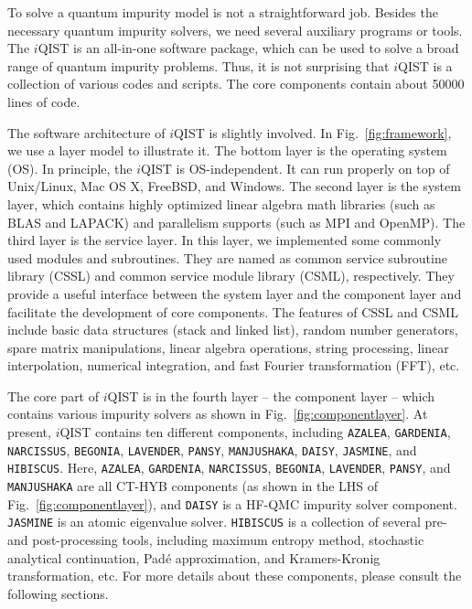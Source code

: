 To solve a quantum impurity model is not a straightforward job. Besides the necessary quantum impurity solvers, we need several auxiliary programs or tools. The $i$QIST is an all-in-one software package, which can be used to solve a broad range of quantum impurity problems. Thus, it is not surprising that $i$QIST is a collection of various codes and scripts. The core components contain about 50000 lines of code. 

The software architecture of $i$QIST is slightly involved. In Fig.~\ref{fig:framework}, we use a layer model to illustrate it. The bottom layer is the operating system (OS). In principle, the $i$QIST is OS-independent. It can run properly on top of Unix/Linux, Mac OS X, FreeBSD, and Windows. The second layer is the system layer, which contains highly optimized linear algebra math libraries (such as BLAS and LAPACK) and parallelism supports (such as MPI and OpenMP). The third layer is the service layer. In this layer, we implemented some commonly used modules and subroutines. They are named as common service subroutine library (CSSL) and common service module library (CSML), respectively. They provide a useful interface between the system layer and the component layer and facilitate the development of core components. The features of CSSL and CSML include basic data structures (stack and linked list), random number generators, spare matrix manipulations, linear algebra operations, string processing, linear interpolation, numerical integration, and fast Fourier transformation (FFT), etc. 

The core part of $i$QIST is in the fourth layer -- the component layer -- which contains various impurity solvers as shown in Fig.~\ref{fig:componentlayer}. At present, $i$QIST contains ten different components, including \texttt{AZALEA}, \texttt{GARDENIA}, \texttt{NARCISSUS}, \texttt{BEGONIA}, \texttt{LAVENDER}, \texttt{PANSY}, \texttt{MANJUSHAKA}, \texttt{DAISY}, \texttt{JASMINE}, and \texttt{HIBISCUS}. Here, \texttt{AZALEA}, \texttt{GARDENIA}, \texttt{NARCISSUS}, \texttt{BEGONIA}, \texttt{LAVENDER}, \texttt{PANSY}, and \texttt{MANJUSHAKA} are all CT-HYB components (as shown in the LHS of Fig.~\ref{fig:componentlayer}), and \texttt{DAISY} is a HF-QMC impurity solver component. \texttt{JASMINE} is an atomic eigenvalue solver. \texttt{HIBISCUS} is a collection of several pre- and post-processing tools, including maximum entropy method, stochastic analytical continuation, Pad\'{e} approximation, and Kramers-Kronig transformation, etc. For more details about these components, please consult the following sections. 

